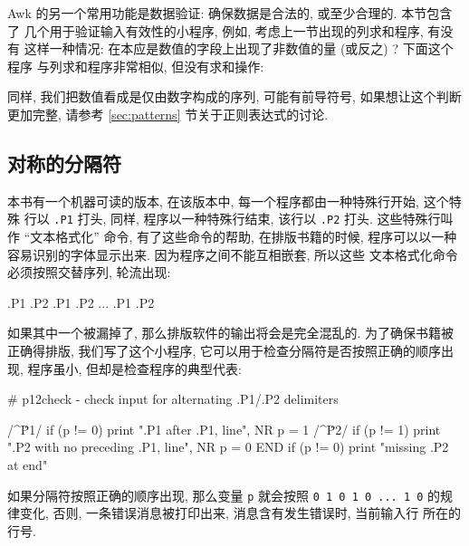 Awk 的另一个常用功能是数据验证: 确保数据是合法的, 或至少合理的. 本节包含了
几个用于验证输入有效性的小程序, 例如, 考虑上一节出现的列求和程序, 有没有
这样一种情况: 在本应是数值的字段上出现了非数值的量 (或反之) ? 下面这个程序 
与列求和程序非常相似, 但没有求和操作:
同样, 我们把数值看成是仅由数字构成的序列, 可能有前导符号, 如果想让这个判断
更加完整, 请参考 \ref{sec:patterns} 节关于正则表达式的讨论.

\subsection{对称的分隔符}
\label{subsec:balanced_delimiters}

本书有一个机器可读的版本, 在该版本中, 每一个程序都由一种特殊行开始,
这个特殊
行以 \verb'.P1' 打头, 同样, 程序以一种特殊行结束, 该行以 \verb'.P2' 打头.
这些特殊行叫作 ``文本格式化'' 命令, 有了这些命令的帮助, 在排版书籍的时候,
程序可以以一种容易识别的字体显示出来. 因为程序之间不能互相嵌套, 所以这些 
文本格式化命令必须按照交替序列, 轮流出现:
\begin{shell}
    .P1 .P2 .P1 .P2 ... .P1 .P2
\end{shell}
如果其中一个被漏掉了, 那么排版软件的输出将会是完全混乱的. 为了确保书籍被
正确得排版, 我们写了这个小程序, 它可以用于检查分隔符是否按照正确的顺序出现,
程序虽小, 但却是检查程序的典型代表:
\begin{awkcode}
    # p12check - check input for alternating .P1/.P2 delimiters
    
    /^\.P1/ { if (p != 0)
                  print ".P1 after .P1, line", NR
              p = 1
            }
    /^\.P2/ { if (p != 1)
                  print ".P2 with no preceding .P1, line", NR
              p = 0
            }
    END     { if (p != 0) print "missing .P2 at end" }
\end{awkcode}
如果分隔符按照正确的顺序出现, 那么变量 \verb'p' 就会按照 \texttt{0 1 0 1 0
... 1 0} 的规律变化, 否则, 一条错误消息被打印出来, 消息含有发生错误时,
当前输入行 所在的行号.

